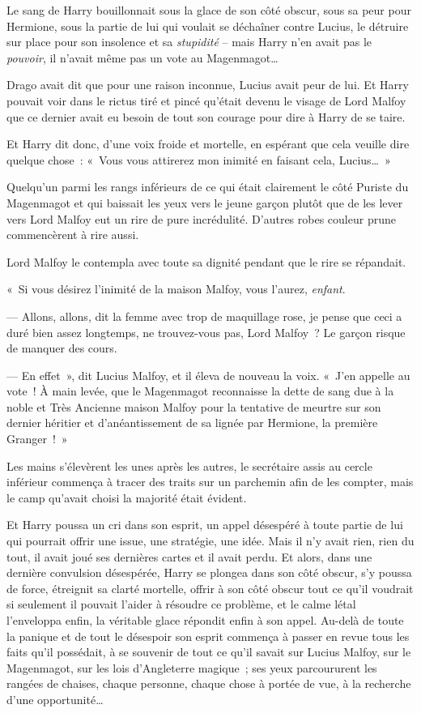 \later

Le sang de Harry bouillonnait sous la glace de son côté obscur, sous sa peur pour Hermione, sous la partie de lui qui voulait se déchaîner contre Lucius, le détruire sur place pour son insolence et sa \emph{stupidité} -- mais Harry n'en avait pas le \emph{pouvoir}, il n'avait même pas un vote au Magenmagot…

Drago avait dit que pour une raison inconnue, Lucius avait peur de lui.
Et Harry pouvait voir dans le rictus tiré et pincé qu'était devenu le visage de Lord Malfoy que ce dernier avait eu besoin de tout son courage pour dire à Harry de se taire.

Et Harry dit donc, d'une voix froide et mortelle, en espérant que cela veuille dire quelque chose~: «~Vous vous attirerez mon inimité en faisant cela, Lucius…~»

Quelqu'un parmi les rangs inférieurs de ce qui était clairement le côté Puriste du Magenmagot et qui baissait les yeux vers le jeune garçon plutôt que de les lever vers Lord Malfoy eut un rire de pure incrédulité.
D'autres robes couleur prune commencèrent à rire aussi.

Lord Malfoy le contempla avec toute sa dignité pendant que le rire se répandait.

«~Si vous désirez l'inimité de la maison Malfoy, vous l'aurez, \emph{enfant}.

--- Allons, allons, dit la femme avec trop de maquillage rose, je pense que ceci a duré bien assez longtemps, ne trouvez-vous pas, Lord Malfoy~?
Le garçon risque de manquer des cours.

--- En effet~», dit Lucius Malfoy, et il éleva de nouveau la voix.
«~J'en appelle au vote~!
À main levée, que le Magenmagot reconnaisse la dette de sang due à la noble et Très Ancienne maison Malfoy pour la tentative de meurtre sur son dernier héritier et d'anéantissement de sa lignée par Hermione, la première Granger~!~»

Les mains s'élevèrent les unes après les autres, le secrétaire assis au cercle inférieur commença à tracer des traits sur un parchemin afin de les compter, mais le camp qu'avait choisi la majorité était évident.

Et Harry poussa un cri dans son esprit, un appel désespéré à toute partie de lui qui pourrait offrir une issue, une stratégie, une idée.
Mais il n'y avait rien, rien du tout, il avait joué ses dernières cartes et il avait perdu.
Et alors, dans une dernière convulsion désespérée, Harry se plongea dans son côté obscur, s'y poussa de force, étreignit sa clarté mortelle, offrir à son côté obscur tout ce qu'il voudrait si seulement il pouvait l'aider à résoudre ce problème, et le calme létal l'enveloppa enfin, la véritable glace répondit enfin à son appel.
Au-delà de toute la panique et de tout le désespoir son esprit commença à passer en revue tous les faits qu'il possédait, à se souvenir de tout ce qu'il savait sur Lucius Malfoy, sur le Magenmagot, sur les lois d'Angleterre magique~; ses yeux parcoururent les rangées de chaises, chaque personne, chaque chose à portée de vue, à la recherche d'une opportunité…
